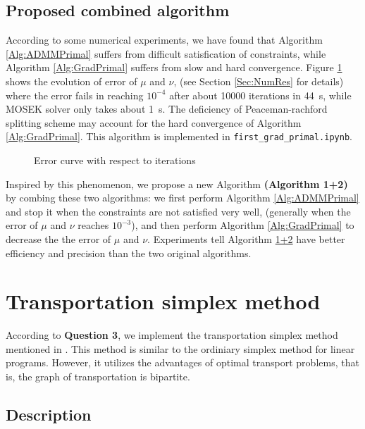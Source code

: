 \documentclass[english]{pkupaper}
\begin{document}
\subsection{Proposed combined algorithm}

According to some numerical experiments, we have found that Algorithm \ref{Alg:ADMMPrimal} suffers from difficult satisfication of constraints, while Algorithm \ref{Alg:GradPrimal} suffers from slow and hard convergence. Figure \ref{Fig:Loss} shows the evolution of error of $\mu$ and $\nu$, (see Section \ref{Sec:NumRes} for details) where the error fails in reaching $10^{-4}$ after about 10000 iterations in \SI{44}{\second}, while MOSEK solver only takes about \SI{1}{\second}. The deficiency of Peaceman-rachford splitting scheme may account for the hard convergence of Algorithm \ref{Alg:GradPrimal}. This algorithm is implemented in \verb"first_grad_primal.ipynb".

\begin{figure}
\centering \scalebox{0.65}{} 
\caption{Error curve with respect to iterations} \label{Fig:Loss}
\end{figure}

Inspired by this phenomenon, we propose a new Algorithm \textbf{(Algorithm \hypertarget{EAlg:12}{1+2})} by combing these two algorithms: we first perform Algorithm \ref{Alg:ADMMPrimal} and stop it when the constraints are not satisfied very well, (generally when the error of $\mu$ and $\nu$ reaches $10^{-3}$), and then perform Algorithm \ref{Alg:GradPrimal} to decrease the the error of $\mu$ and $\nu$. Experiments tell Algorithm \hyperlink{EAlg:12}{1+2} have better efficiency and precision than the two original algorithms.

\section{Transportation simplex method} \label{Sec:TS}

According to \textbf{Question 3}, we implement the transportation simplex method mentioned in \parencite{Schrieber2017}. This method is similar to the ordiniary simplex method for linear programs. However, it utilizes the advantages of optimal transport problems, that is, the graph of transportation is bipartite.

\subsection{Description}
\end{document}
